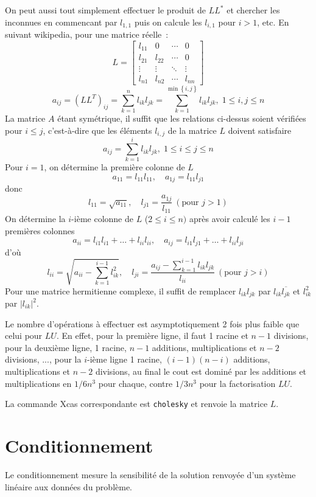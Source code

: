 \documentclass[a4paper,11pt]{book}
\begin{document}
\begin{giacjshere}
On peut aussi tout simplement effectuer le produit de $L L^*$ et
chercher les inconnues en commencant par $l_{1,1}$ puis on calcule
les $l_{i,1}$ pour $i>1$, etc. En suivant wikipedia, pour une matrice r\'eelle~:
\[ L=\begin{bmatrix}
l_{11}& 0 & \cdots & 0 \\
l_{21} & l_{22}& \cdots & 0\\
\vdots & \vdots & \ddots & \vdots\\
l_{n1} & l_{n2} & \cdots & l_{nn}
\end{bmatrix} \]
\[ a_{ij}=\left(LL^{T}\right)_{ij}={\sum_{k=1}^{n}l_{ik}l_{jk}}=
{\sum_{k=1}^{\min\left\{ i,j\right\} }l_{ik}l_{jk}},\;1\leq i,j\leq n \]
La matrice $A$ étant sym\'etrique, il suffit que les relations ci-dessus
soient v\'erifi\'ees pour $i \leq j$, 
c'est-à-dire que les \'el\'ements $l_{i,j}$ de la matrice $L$ doivent
satisfaire
\[ a_{ij}={\sum_{k=1}^{i}l_{ik}l_{jk}},\;1\leq i\leq j\leq n \]
Pour $i=1$, on d\'etermine la premi\`ere colonne de $L$
\[ a_{11}=l_{11}l_{11}, \quad a_{1j}=l_{11}l_{j1}\]
donc
\[ l_{11}=\sqrt{a_{11}}, \quad l_{j1}=\frac{a_{1j}}{l_{11}}
\ (\mbox{pour } j>1) \]
On d\'etermine la $i$-i\`eme colonne de $L$ ($2\leq i\leq n)$ apr\`es avoir
calculé les $i-1$ premi\`eres colonnes
\[ a_{ii}=l_{i1}l_{i1}+\ldots+l_{ii}l_{ii}, \quad
a_{ij}=l_{i1}l_{j1}+\ldots+l_{ii}l_{ji} \]
d'où 
\[ l_{ii}= \sqrt{{a_{ii}-{\sum_{k=1}^{i-1}l_{ik}^{2}}}}, \quad
l_{ji}=\frac{a_{ij}-{\sum_{k=1}^{i-1}l_{ik}l_{jk}}}{l_{ii}} \ 
(\mbox{pour } j > i)\]
Pour une matrice hermitienne complexe, il suffit de remplacer
$l_{ik}l_{jk}$ par $l_{ik}\overline{l_{jk}}$ et $l_{ik}^{2}$ par
$|l_{ik}|^{2}$.

Le nombre d'op\'erations \`a effectuer est asymptotiquement
2 fois plus faible que celui pour $LU$. En effet,
pour la premi\`ere ligne, il faut 1 racine et $n-1$ divisions,
pour la deuxi\`eme ligne, 1 racine, $n-1$ additions, multiplications
et $n-2$ divisions, ..., pour la $i$-i\`eme ligne 1 racine,
$(i-1)(n-i)$ additions, multiplications et $n-2$ divisions, au final
le cout est domin\'e par les additions et multiplications en $1/6n^3$
pour chaque, contre $1/3n^3$ pour la
factorisation $LU$.

La commande Xcas correspondante est \verb|cholesky| et renvoie
la matrice $L$.

\section{Conditionnement}  
Le conditionnement mesure la sensibilit\'e de la solution renvoy\'ee d'un
syst\`eme lin\'eaire aux donn\'ees du probl\`eme.


\end{giacjshere}
\end{document}
